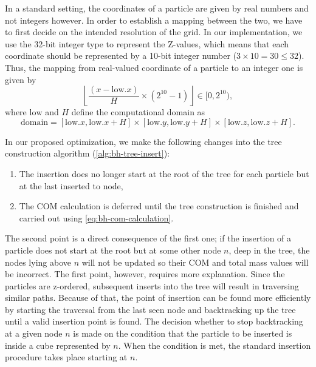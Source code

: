 In a standard setting, the coordinates of a particle are given by real numbers and not integers however.
In order to establish a mapping between the two, we have to first decide on the intended resolution of the grid.
In our implementation, we use the 32-bit integer type to represent the Z-values, which means that each coordinate should be represented by a 10-bit integer number ($3 \times 10 = 30 \leq 32$).
Thus, the mapping from real-valued coordinate of a particle to an integer one is given by
\begin{equation*}
    \left\lfloor \frac{(x - \text{low}.x)}{H} \times (2^{10} - 1)\right\rfloor \in [0, 2^{10}),
\end{equation*}
where $\text{low}$ and $H$ define the computational domain as
\begin{equation*}
    \text{domain} = [\text{low}.x, \text{low}.x + H] \times [\text{low}.y, \text{low}.y + H] \times [\text{low}.z, \text{low}.z + H].
\end{equation*}

In our proposed optimization, we make the following changes into the tree construction algorithm (\autoref{alg:bh-tree-insert}):
\begin{enumerate}
    \item The insertion does no longer start at the root of the tree for each particle but at the last inserted to node,
    \item The COM calculation is deferred until the tree construction is finished and carried out using \autoref{eq:bh-com-calculation}.
\end{enumerate}
The second point is a direct consequence of the first one;
if the insertion of a particle does not start at the root but at some other node $n$, deep in the tree, the nodes lying above $n$ will not be updated so their COM and total mass values will be incorrect.
The first point, however, requires more explanation.
Since the particles are z-ordered, subsequent inserts into the tree will result in traversing similar paths.
Because of that, the point of insertion can be found more efficiently by starting the traversal from the last seen node and backtracking up the tree until a valid insertion point is found.
The decision whether to stop backtracking at a given node $n$ is made on the condition that the particle to be inserted is inside a cube represented by $n$.
When the condition is met, the standard insertion procedure takes place starting at $n$.

